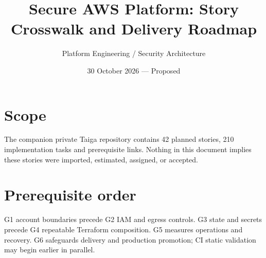 \documentclass[11pt,letterpaper]{article}
\title{Secure AWS Platform: Story Crosswalk and Delivery Roadmap}
\author{Platform Engineering / Security Architecture}
\date{30 October 2026 --- Proposed}
\begin{document}
\maketitle
\tableofcontents

\section{Scope}
The companion private Taiga repository contains 42 planned stories, 210 implementation tasks and prerequisite links. Nothing in this document implies these stories were imported, estimated, assigned, or accepted.

\section{Prerequisite order}
G1 account boundaries precede G2 IAM and egress controls. G3 state and secrets precede G4 repeatable Terraform composition. G5 measures operations and recovery. G6 safeguards delivery and production promotion; CI static validation may begin earlier in parallel.
\end{document}
